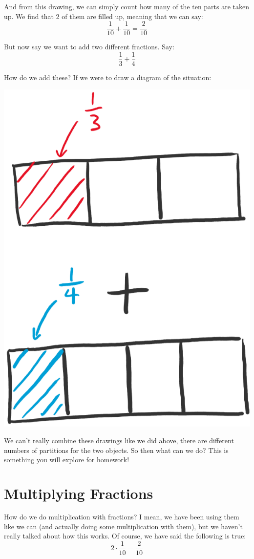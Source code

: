 \documentclass{article}
\begin{document}
And from this drawing, we can simply count how many of the ten parts are taken up. We find that 2 of them are filled up, meaning that we can say: 
\[ \frac{1}{10} + \frac{1}{10} = \frac{2}{10} \]

But now say we want to add two different fractions. Say: 
\[ \frac{1}{3} + \frac{1}{4} \]

How do we add these? If we were to draw a diagram of the situation: 
\begin{center}
    \includegraphics[scale=0.5]{chapter5_draw5.png}
\end{center}

We can't really combine these drawings like we did above, there are different numbers of partitions for the two objects. So then what can we do? 
This is something you will explore for homework! 

\section*{Multiplying Fractions}
How do we do multiplication with fractions? I mean, we have been using them like we can (and actually doing some multiplication with them), but we haven't really talked about how this works. Of course, we have said the following is true: 
\[ 2 \cdot \frac{1}{10} = \frac{2}{10} \]
\end{document}
